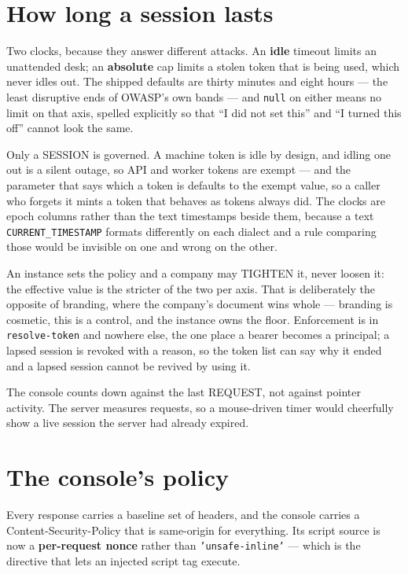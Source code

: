 \documentclass[11pt,a4paper]{report}
\begin{document}
\section{How long a session lasts}

Two clocks, because they answer different attacks. An \textbf{idle} timeout limits an unattended desk; an \textbf{absolute} cap limits a stolen token that is being used, which never idles out. The shipped defaults are thirty minutes and eight hours --- the least disruptive ends of OWASP's own bands --- and \texttt{null} on either means no limit on that axis, spelled explicitly so that ``I did not set this'' and ``I turned this off'' cannot look the same.

Only a SESSION is governed. A machine token is idle by design, and idling one out is a silent outage, so API and worker tokens are exempt --- and the parameter that says which a token is defaults to the exempt value, so a caller who forgets it mints a token that behaves as tokens always did. The clocks are epoch columns rather than the text timestamps beside them, because a text \texttt{CURRENT\_TIMESTAMP} formats differently on each dialect and a rule comparing those would be invisible on one and wrong on the other.

An instance sets the policy and a company may TIGHTEN it, never loosen it: the effective value is the stricter of the two per axis. That is deliberately the opposite of branding, where the company's document wins whole --- branding is cosmetic, this is a control, and the instance owns the floor. Enforcement is in \texttt{resolve-token} and nowhere else, the one place a bearer becomes a principal; a lapsed session is revoked with a reason, so the token list can say why it ended and a lapsed session cannot be revived by using it.

The console counts down against the last REQUEST, not against pointer activity. The server measures requests, so a mouse-driven timer would cheerfully show a live session the server had already expired.

\section{The console's policy}

Every response carries a baseline set of headers, and the console carries a Content-Security-Policy that is same-origin for everything. Its script source is now a \textbf{per-request nonce} rather than \texttt{'unsafe-inline'} --- which is the directive that lets an injected script tag execute.
\end{document}

